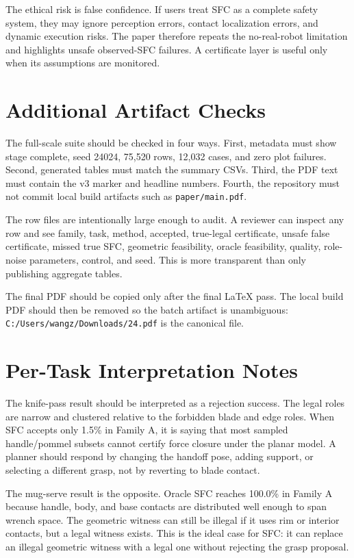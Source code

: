 \documentclass{article}
\begin{document}
The ethical risk is false confidence. If users treat SFC as a complete safety system, they may ignore perception errors, contact localization errors, and dynamic execution risks. The paper therefore repeats the no-real-robot limitation and highlights unsafe observed-SFC failures. A certificate layer is useful only when its assumptions are monitored.

\section{Additional Artifact Checks}

The full-scale suite should be checked in four ways. First, metadata must show stage complete, seed 24024, 75,520 rows, 12,032 cases, and zero plot failures. Second, generated tables must match the summary CSVs. Third, the PDF text must contain the v3 marker and headline numbers. Fourth, the repository must not commit local build artifacts such as \texttt{paper/main.pdf}.

The row files are intentionally large enough to audit. A reviewer can inspect any row and see family, task, method, accepted, true-legal certificate, unsafe false certificate, missed true SFC, geometric feasibility, oracle feasibility, quality, role-noise parameters, control, and seed. This is more transparent than only publishing aggregate tables.

The final PDF should be copied only after the final LaTeX pass. The local build PDF should then be removed so the batch artifact is unambiguous: \texttt{C:/Users/wangz/Downloads/24.pdf} is the canonical file.

\section{Per-Task Interpretation Notes}

The knife-pass result should be interpreted as a rejection success. The legal roles are narrow and clustered relative to the forbidden blade and edge roles. When SFC accepts only 1.5\% in Family A, it is saying that most sampled handle/pommel subsets cannot certify force closure under the planar model. A planner should respond by changing the handoff pose, adding support, or selecting a different grasp, not by reverting to blade contact.

The mug-serve result is the opposite. Oracle SFC reaches 100.0\% in Family A because handle, body, and base contacts are distributed well enough to span wrench space. The geometric witness can still be illegal if it uses rim or interior contacts, but a legal witness exists. This is the ideal case for SFC: it can replace an illegal geometric witness with a legal one without rejecting the grasp proposal.
\end{document}
